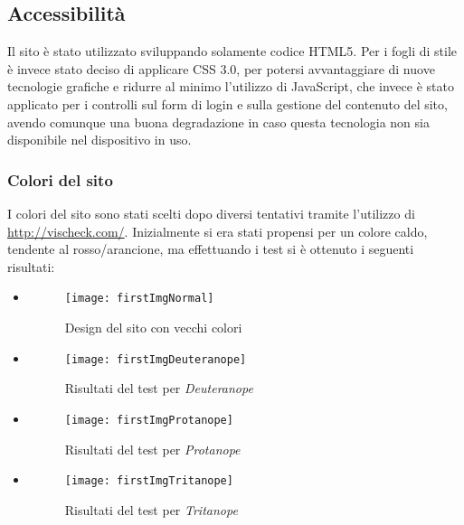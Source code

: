 \graphicspath{ {res/img/} }

\subsection{Accessibilità}
Il sito è stato utilizzato sviluppando solamente codice HTML5. Per i fogli di stile è invece stato deciso di applicare CSS 3.0, per potersi avvantaggiare di nuove tecnologie grafiche e ridurre al minimo l'utilizzo di JavaScript, che invece è stato applicato per i controlli sul form di login e sulla gestione del contenuto del sito, avendo comunque una buona degradazione in caso questa tecnologia non sia disponibile nel dispositivo in uso.

\subsubsection{Colori del sito}
I colori del sito sono stati scelti dopo diversi tentativi tramite l'utilizzo di \url{http://vischeck.com/}. Inizialmente si era stati propensi per un colore caldo, tendente al rosso/arancione, ma effettuando i test si è ottenuto i seguenti risultati:

\begin{itemize}

    \item[]
        \begin{figure}[H]

            \centering
            \texttt{[image: firstImgNormal]}
            \caption{Design del sito con vecchi colori}
        \end{figure}

    \item[]
        \begin{figure}[H]

            \centering
            \texttt{[image: firstImgDeuteranope]}
            \caption{Risultati del test per \textit{Deuteranope}}
        \end{figure}

    \item[]
        \begin{figure}[H]

            \centering
            \texttt{[image: firstImgProtanope]}
            \caption{Risultati del test per \textit{Protanope}}
        \end{figure}

    \item[]
        \begin{figure}[H]

            \centering
            \texttt{[image: firstImgTritanope]}
            \caption{Risultati del test per \textit{Tritanope}}
        \end{figure}

\end{itemize}

